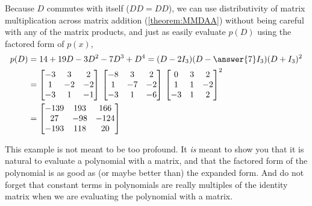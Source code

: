 \documentclass{ximera}
\begin{document}
\begin{example}
Because $D$ commutes with itself ($DD=DD$), we can use distributivity of matrix multiplication across matrix addition (\ref{theorem:MMDAA}) without being careful with any of the matrix products, and just as easily evaluate $p(D)$ using the factored form of $p(x)$,
\begin{align*}
p(D)&=14+19D-3D^2-7D^3+D^4=(D-2I_3)(D-\answer{7}I_3)(D+I_3)^2\\
&=
\begin{bmatrix}
-3 & 3 & 2\\ 1 & -2 & -2\\ -3 & 1 & -1
\end{bmatrix}\,
\begin{bmatrix}
-8 & 3 & 2\\ 1 & -7 & -2\\ -3 & 1 & -6
\end{bmatrix}\,
\begin{bmatrix}
0 & 3 & 2\\ 1 & 1 & -2\\ -3 & 1 & 2
\end{bmatrix}^2\\
&=
\begin{bmatrix}
-139 & 193 & 166\\
27 & -98 & -124\\
-193 & 118 & 20
\end{bmatrix}
\end{align*}


This example is not meant to be too profound.  It \textit{is} meant to show you that it is natural to evaluate a polynomial with a matrix, and that the factored form of the polynomial is as good as (or maybe better than) the expanded form.  And do not forget that constant terms in polynomials are really multiples of the identity matrix when we are evaluating the polynomial with a matrix.

\end{example}
\end{document}
